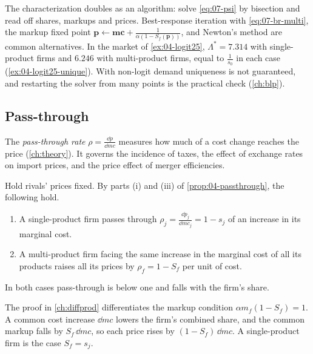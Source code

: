 The characterization doubles as an algorithm: solve \eqref{eq:07-psi} by bisection and read off shares, markups and
prices. Best-response iteration with \eqref{eq:07-br-multi}, the markup fixed point $\boldsymbol p \leftarrow
\boldsymbol{mc} + \frac{1}{\alpha(1 - S_f(\boldsymbol p))}$, and Newton's method are common alternatives. In the
market of \cref{ex:04-logit25}, $\Lambda^* = 7.314$ with single-product firms and $6.246$ with multi-product firms,
equal to $\frac{1}{s_0}$ in each case (\cref{ex:04-logit25-unique}). With non-logit demand uniqueness is not
guaranteed, and restarting the solver from many points is the practical check (\cref{ch:blp}).

\subsection{Pass-through}\label{sec:07-passthrough}

The \emph{pass-through rate} $\rho = \frac{\dd p}{\dd mc}$ measures how much of a cost change reaches the price
(\cref{ch:theory}). It governs the incidence of taxes, the effect of exchange rates on import prices, and the price
effect of merger efficiencies.

\begin{proposition}\label{prop:07-logit-passthrough}
Hold rivals' prices fixed. By parts (i) and (iii) of \cref{prop:04-passthrough}, the following hold.
\begin{enumerate}[label=(\roman*)]
  \item A single-product firm passes through $\rho_j = \frac{\dd p_j}{\dd mc_j} = 1 - s_j$ of an increase in its
    marginal cost.
  \item A multi-product firm facing the same increase in the marginal cost of all its products raises all its prices by
    $\rho_f = 1 - S_f$ per unit of cost.
\end{enumerate}
In both cases pass-through is below one and falls with the firm's share.
\end{proposition}

The proof in \cref{ch:diffprod} differentiates the markup condition $\alpha m_f(1 - S_f) = 1$. A common cost increase
$\dd mc$ lowers the firm's combined share, and the common markup falls by $S_f\,\dd mc$, so each price rises by $(1 -
S_f)\,\dd mc$. A single-product firm is the case $S_f = s_j$.

